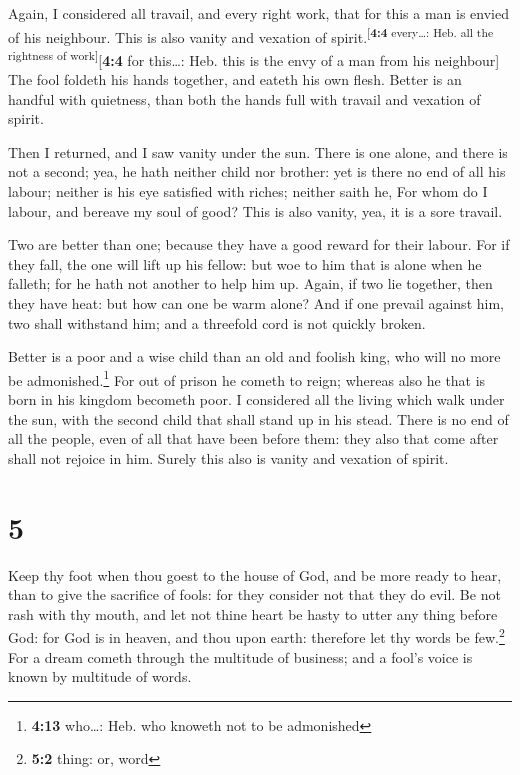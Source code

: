 Again, I considered all travail, and every right work,
that for this a man is envied of his neighbour. This is also vanity and
vexation of spirit.\textsuperscript{{[}\textbf{4:4} every\ldots: Heb.
all the rightness of work{]}}{[}\textbf{4:4} for this\ldots: Heb. this
is the envy of a man from his neighbour{]}  The fool
foldeth his hands together, and eateth his own flesh. 
Better is an handful with quietness, than both the hands full with
travail and vexation of spirit.

 Then I returned, and I saw vanity under the sun.
 There is one alone, and there is not a second; yea, he
hath neither child nor brother: yet is there no end of all his labour;
neither is his eye satisfied with riches; neither saith he, For whom do
I labour, and bereave my soul of good? This is also vanity, yea, it is a
sore travail.

 Two are better than one; because they have a good reward
for their labour.  For if they fall, the one will lift up
his fellow: but woe to him that is alone when he falleth; for he hath
not another to help him up.  Again, if two lie together,
then they have heat: but how can one be warm alone?  And
if one prevail against him, two shall withstand him; and a threefold
cord is not quickly broken.

 Better is a poor and a wise child than an old and
foolish king, who will no more be admonished.\footnote{\textbf{4:13}
  who\ldots: Heb. who knoweth not to be admonished}  For
out of prison he cometh to reign; whereas also he that is born in his
kingdom becometh poor.  I considered all the living which
walk under the sun, with the second child that shall stand up in his
stead.  There is no end of all the people, even of all
that have been before them: they also that come after shall not rejoice
in him. Surely this also is vanity and vexation of spirit.

\hypertarget{section-4}{%
\section{5}\label{section-4}}

 Keep thy foot when thou goest to the house of God, and be
more ready to hear, than to give the sacrifice of fools: for they
consider not that they do evil.  Be not rash with thy
mouth, and let not thine heart be hasty to utter any thing before God:
for God is in heaven, and thou upon earth: therefore let thy words be
few.\footnote{\textbf{5:2} thing: or, word}  For a dream
cometh through the multitude of business; and a fool's voice is known by
multitude of words.

